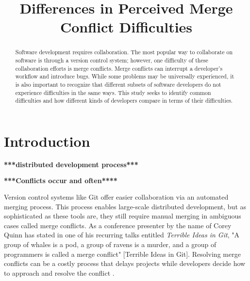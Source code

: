 \documentclass[conference]{IEEEtran}
\begin{document}
\title{Differences in Perceived Merge Conflict Difficulties}

\author{
}

\maketitle

\begin{abstract}
Software development requires collaboration. The most popular way to collaborate on software is through a version control system; however, one difficulty of these collaboration efforts is merge conflicts. Merge conflicts can interrupt a developer's workflow and introduce bugs. While some problems may be universally experienced, it is also important to recognize that different subsets of software developers do not experience difficulties in the same ways. This study seeks to identify common difficulties and how different kinds of developers compare in terms of their difficulties.
\end{abstract}

\IEEEpeerreviewmaketitle



\section{Introduction}
\textbf{***distributed development process***}

\textbf{***Conflicts occur and often****}

Version control systems like Git offer easier collaboration via an automated merging process. This process enables large-scale distributed development, but as sophisticated as these tools are, they still require manual merging in ambiguous cases called merge conflicts. As a conference presenter by the name of Corey Quinn has stated in one of his recurring talks entitled \textit{Terrible Ideas in Git}, "A group of whales is a pod, a group of ravens is a murder, and a group of programmers is called a merge conflict" [Terrible Ideas in Git]. Resolving merge conflicts can be a costly process that delays projects while developers decide how to approach and resolve the conflict \cite{cassandra}. 
\end{document}
